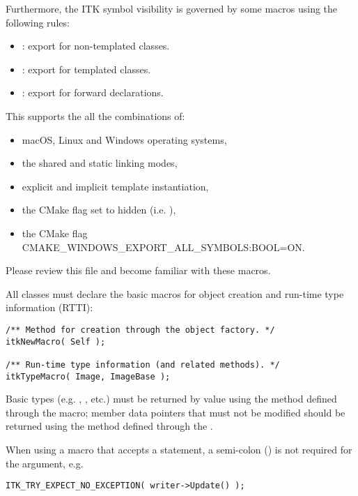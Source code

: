Furthermore, the ITK symbol visibility is governed by some macros using the
following rules:
\begin{itemize}
\item {}: export for non-templated classes.
\item {}: export for templated classes.
\item {}: export for forward declarations.
\end{itemize}

This supports the all the combinations of:
\begin{itemize}
\item macOS, Linux and Windows operating systems,
\item the shared   and  static
linking modes,
\item explicit and implicit template instantiation,
\item the CMake  flag set to hidden (i.e.
),
\item the CMake flag {CMAKE\_WINDOWS\_EXPORT\_ALL\_SYMBOLS:BOOL=ON}.
\end{itemize}

Please review this file and become familiar with these macros.

All classes must declare the basic macros for object creation and run-time type
information (RTTI):

\small
\begin{verbatim}
/** Method for creation through the object factory. */
itkNewMacro( Self );

/** Run-time type information (and related methods). */
itkTypeMacro( Image, ImageBase );
\end{verbatim}
\normalsize

Basic types (e.g. , , etc.) must be returned by value
using the method defined through the  macro; member data
pointers that must not be modified should be returned using the method defined
through the .

When using a macro that accepts a statement, a semi-colon (\code{;}) is not
required for the argument, e.g.

\small
\begin{verbatim}
ITK_TRY_EXPECT_NO_EXCEPTION( writer->Update() );
\end{verbatim}
\normalsize


